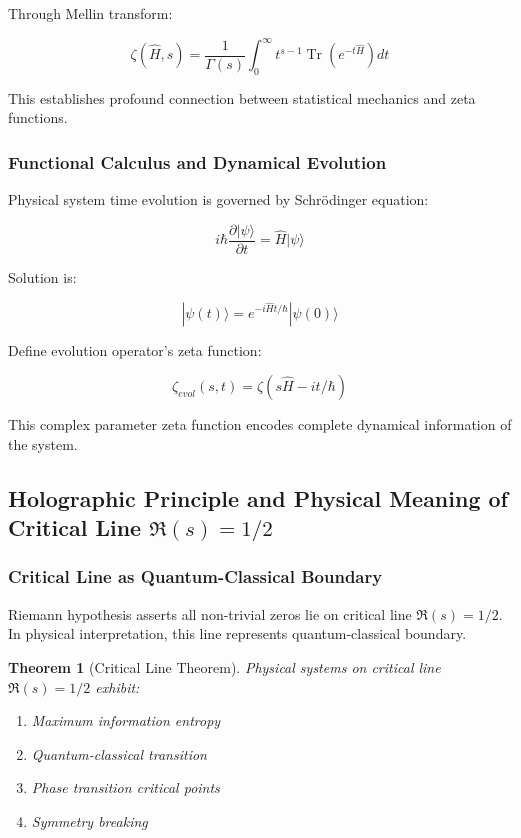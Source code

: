 \documentclass[12pt,a4paper]{article}
\newtheorem{theorem}{Theorem}[section]
\DeclareMathOperator{\Tr}{Tr}
\begin{document}
Through Mellin transform:

$$\zeta(\hat{H}, s) = \frac{1}{\Gamma(s)} \int_0^{\infty} t^{s-1} \Tr(e^{-t\hat{H}}) dt$$

This establishes profound connection between statistical mechanics and zeta functions.

\subsubsection{Functional Calculus and Dynamical Evolution}

Physical system time evolution is governed by Schrödinger equation:

$$i\hbar \frac{\partial |\psi\rangle}{\partial t} = \hat{H} |\psi\rangle$$

Solution is:

$$|\psi(t)\rangle = e^{-i\hat{H}t/\hbar} |\psi(0)\rangle$$

Define evolution operator's zeta function:

$$\zeta_{evol}(s, t) = \zeta(s\hat{H} - it/\hbar)$$

This complex parameter zeta function encodes complete dynamical information of the system.

\subsection{Holographic Principle and Physical Meaning of Critical Line $\Re(s)=1/2$}

\subsubsection{Critical Line as Quantum-Classical Boundary}

Riemann hypothesis asserts all non-trivial zeros lie on critical line $\Re(s) = 1/2$. In physical interpretation, this line represents quantum-classical boundary.

\begin{theorem}[Critical Line Theorem]
Physical systems on critical line $\Re(s) = 1/2$ exhibit:
\begin{enumerate}
\item Maximum information entropy
\item Quantum-classical transition
\item Phase transition critical points
\item Symmetry breaking
\end{enumerate}
\end{theorem}
\end{document}
